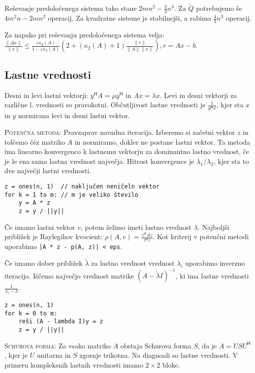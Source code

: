 \documentclass[a4paper,10pt]{article}
\theoremstyle{definition}
\renewcommand{\H}{\mathsf{H}\!}
\begin{document}
Reševanje predoločenega sistema tako stane $2mn^2 - \frac23n^3$. Za $\tilde{Q}$
potrebujemo še $4m^2n-2mn^2$ operacij. Za kvadratne sisteme je stabilnejši, a
rabimo $\frac43n^3$ operacij.

Za napako pri reševanju predoločenega sistema velja:
$\frac{\|\Delta x\|}{\|x\|} \leq \frac{\varepsilon\kappa_2(A)}{1-\varepsilon\kappa_2(A)}
\left(2+(\kappa_2(A) + 1)\frac{\|r\|}{\|A\|\|x\|} \right), r = Ax -b$.

\subsection*{Lastne vrednosti}
Desni in levi lastni vektorji: $y^\H A = \mu y^\H$ in $Ax = \lambda x$. Levi in
desni vektorji za različne l. vrednosti so pravokotni. Občutljivost lastne
vrednosti je $\frac{1}{y^\H x}$, kjer sta $x$ in $y$ normirana levi in desni
lastni vektor.

\textsc{Potenčna metoda:} Pravzaprav navadna iteracija. Izberemo si začetni
vektor $z$ in tolčemo č\'{e}z matriko $A$ in normiramo, dokler ne postane lastni vektor. Ta
metoda ima linearno konvergenco k lastnemu vektorju za dominantno lastno
vrednost, če je le ena sama lastna vrednost največja.
Hitrost konvergence je $\lambda_1 / \lambda_2$, kjer sta to dve
največji lastni vrednosti.
\scriptsize
\begin{verbatim}
z = ones(n, 1)  // naključen neničeln vektor
for k = 1 to m: // m je veliko število
    y = A * z
    z = y / ||y||
\end{verbatim}
\normalsize
Če imamo lastni vektor $v$, potem želimo imeti lastno vrednost $\lambda$.
Najboljši približek je Raylegihov kvocient: $\rho(A, v) = \frac{z^\H\!\!Az}{z^\H
z}$.
Kot kriterij v potenčni metodi uporabimo \verb'|A * z - p(A, z)| < eps'.

Če imamo dober približek $\tilde{\lambda}$ za lastno vrednost vrednost
$\lambda_i$ uporabimo inverzno iteracijo. Iščemo največjo vrednost matrike
$(A-\tilde{\lambda}I)^{-1}$, ki
ima lastne vrednosti $\frac{1}{\lambda_i - \lambda}$.
\scriptsize
\begin{verbatim}
z = ones(n, 1)
for k = 0 to m:
    reši (A - lambda I)y = z
    z = y / ||y||
\end{verbatim}
\normalsize

\textsc{Schurova forma:} Za vsako matriko $A$ obstaja Schurova forma $S$, da je
$A = USU^\H$,
kjer je $U$ unitarna in $S$ zgornje trikotna. Na diagnoali so lastne vrednosti.
V primeru kompleksnih lastnih vrednosti imamo $2\times2$ bloke.
\end{document}
